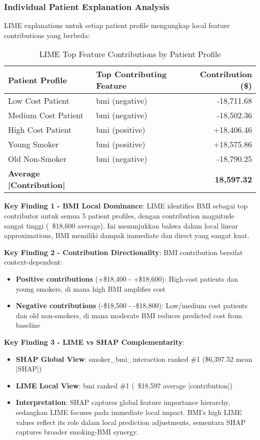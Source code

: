 \subsubsection{Individual Patient Explanation Analysis}

LIME explanations untuk setiap patient profile mengungkap local feature contributions yang berbeda:

\begin{table}[H]
\centering
\caption{LIME Top Feature Contributions by Patient Profile}
\label{tab:lime-top-contributions}
\begin{tabular}{|l|l|r|}
\hline
\textbf{Patient Profile} & \textbf{Top Contributing Feature} & \textbf{Contribution (\$)} \\
\hline
Low Cost Patient & bmi (negative) & -18,711.68 \\
Medium Cost Patient & bmi (negative) & -18,502.36 \\
High Cost Patient & bmi (positive) & +18,406.46 \\
Young Smoker & bmi (positive) & +18,575.86 \\
Old Non-Smoker & bmi (negative) & -18,790.25 \\
\hline
\textbf{Average |Contribution|} & & \textbf{18,597.32} \\
\hline
\end{tabular}
\end{table}

\textbf{Key Finding 1 - BMI Local Dominance}: LIME identifies BMI sebagai top contributor untuk semua 5 patient profiles, dengan contribution magnitude sangat tinggi (~\$18,600 average). Ini menunjukkan bahwa dalam local linear approximations, BMI memiliki dampak immediate dan direct yang sangat kuat.

\textbf{Key Finding 2 - Contribution Directionality}: BMI contribution bersifat context-dependent:
\begin{itemize}
    \item \textbf{Positive contributions} (+\$18,400 - +\$18,600): High-cost patients dan young smokers, di mana high BMI amplifies cost
    \item \textbf{Negative contributions} (-\$18,500 - -\$18,800): Low/medium cost patients dan old non-smokers, di mana moderate BMI reduces predicted cost from baseline
\end{itemize}

\textbf{Key Finding 3 - LIME vs SHAP Complementarity}:
\begin{itemize}
    \item \textbf{SHAP Global View}: smoker\_bmi\_interaction ranked \#1 (\$6,397.52 mean |SHAP|)
    \item \textbf{LIME Local View}: bmi ranked \#1 (~\$18,597 average |contribution|)
    \item \textbf{Interpretation}: SHAP captures global feature importance hierarchy, sedangkan LIME focuses pada immediate local impact. BMI's high LIME values reflect its role dalam local prediction adjustments, sementara SHAP captures broader smoking-BMI synergy.
\end{itemize}

